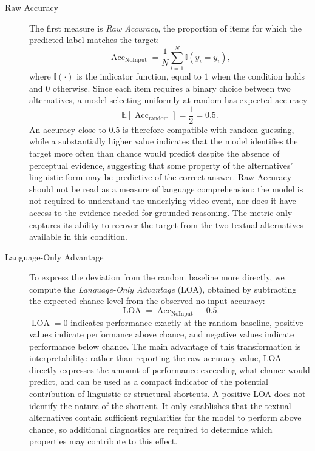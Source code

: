 \begin{description}
    \item[Raw Accuracy] The first measure is \textit{Raw Accuracy}, the proportion of items for which the predicted label matches the target:
    \begin{equation}
    \operatorname{Acc}_{\text{NoInput}} = \frac{1}{N} \sum_{i=1}^{N} \mathbb{I}\left(\hat{y}_i = y_i\right),
    \end{equation}
    where \(\mathbb{I}(\cdot)\) is the indicator function, equal to \(1\) when the condition holds and \(0\) otherwise. Since each item requires a binary choice between two alternatives, a model selecting uniformly at random has expected accuracy
    \begin{equation}
    \mathbb{E}\left[\operatorname{Acc}_{\text{random}}\right] = \frac{1}{2} = 0.5.
    \end{equation}
    An accuracy close to \(0.5\) is therefore compatible with random guessing, while a substantially higher value indicates that the model identifies the target more often than chance would predict despite the absence of perceptual evidence, suggesting that some property of the alternatives' linguistic form may be predictive of the correct answer.
    Raw Accuracy should not be read as a measure of language comprehension: the model is not required to understand the underlying video event, nor does it have access to the evidence needed for grounded reasoning. The metric only captures its ability to recover the target from the two textual alternatives available in this condition.
\item[Language-Only Advantage] To express the deviation from the random baseline more directly, we compute the \textit{Language-Only Advantage} (LOA), obtained by subtracting the expected chance level from the observed no-input accuracy:
    \begin{equation}
    \operatorname{LOA} = \operatorname{Acc}_{\text{NoInput}} - 0.5.
    \end{equation}
    \(\operatorname{LOA}=0\) indicates performance exactly at the random baseline, positive values indicate performance above chance, and negative values indicate performance below chance. The main advantage of this transformation is interpretability: rather than reporting the raw accuracy value, LOA directly expresses the amount of performance exceeding what chance would predict, and can be used as a compact indicator of the potential contribution of linguistic or structural shortcuts.
    A positive LOA does not identify the nature of the shortcut. It only establishes that the textual alternatives contain sufficient regularities for the model to perform above chance, so additional diagnostics are required to determine which properties may contribute to this effect.

\end{description}
